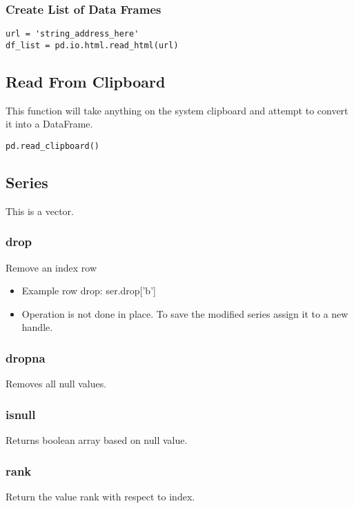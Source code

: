 %
\subsubsection{Create List of Data Frames}
\begin{lstlisting}
url = 'string_address_here'
df_list = pd.io.html.read_html(url)
\end{lstlisting}

\subsection{Read From Clipboard}
This function will take anything on the system clipboard and attempt to convert
it into a DataFrame.
\begin{lstlisting}
pd.read_clipboard()
\end{lstlisting}

\subsection{Series}
This is a vector.

\subsubsection{drop}
Remove an index row
  \begin{itemize}

    \item Example row drop: ser.drop['b']

    \item Operation is not done in place.  To save the modified series
      assign it to a new handle.
  \end{itemize}

\subsubsection{dropna}
Removes all null values.

\subsubsection{isnull}
Returns boolean array based on null value.

\subsubsection{rank}
Return the value rank with respect to index.

